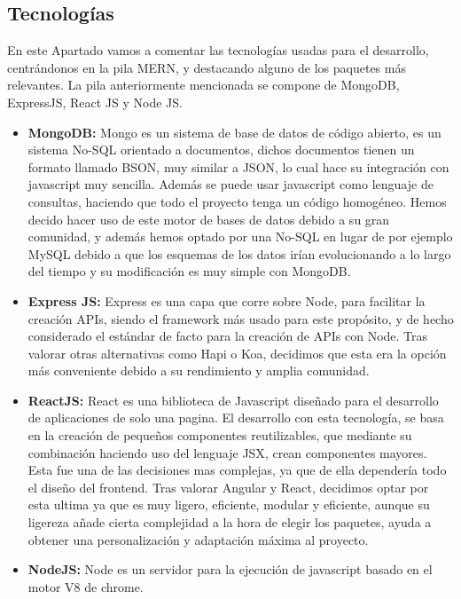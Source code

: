 \subsection {Tecnologías}
En este Apartado vamos a comentar las tecnologías usadas para el desarrollo, centrándonos en la pila MERN, y destacando alguno de los paquetes más relevantes. La pila anteriormente mencionada se compone de MongoDB, ExpressJS, React JS y Node JS.
\begin{itemize}
  \item \textbf{MongoDB:} Mongo es un sistema de base de datos de código abierto, es un sistema No-SQL orientado a documentos, dichos documentos tienen un formato llamado \gls{BSON}, muy similar a \gls{JSON}, lo cual hace su integración con javascript muy sencilla. Además se puede usar javascript como lenguaje de consultas, haciendo que todo el proyecto tenga un código homogéneo. Hemos decido hacer uso de este motor de bases de datos debido a su gran comunidad, y además hemos optado por una No-SQL en lugar de por ejemplo MySQL debido a que los esquemas de los datos irían evolucionando a lo largo del tiempo y su modificación es muy simple con MongoDB.
  
  \item \textbf{Express JS:} Express es una capa que corre sobre Node, para facilitar la creación APIs, siendo el framework más usado para este propósito, y de hecho considerado el estándar de facto para la creación de APIs con Node. Tras valorar otras alternativas como Hapi o Koa, decidimos que esta era la opción más conveniente debido a su rendimiento y amplia comunidad.
  
  \item \textbf{ReactJS:} React es una biblioteca de Javascript diseñado para el desarrollo de aplicaciones de solo una pagina. El desarrollo con esta tecnología, se basa en la creación de pequeños componentes reutilizables, que mediante su combinación haciendo uso del lenguaje \gls{JSX}, crean componentes mayores. Esta fue una de las decisiones mas complejas, ya que de ella dependería todo el diseño del frontend. Tras valorar Angular y React, decidimos optar por esta ultima ya que es muy ligero, eficiente, modular y eficiente, aunque su ligereza añade cierta complejidad a la hora de elegir los paquetes, ayuda a obtener una personalización y adaptación máxima al proyecto.
  
  \item \textbf{NodeJS:} Node es un servidor para la ejecución de javascript basado en el motor V8 de chrome. 
\end{itemize}

